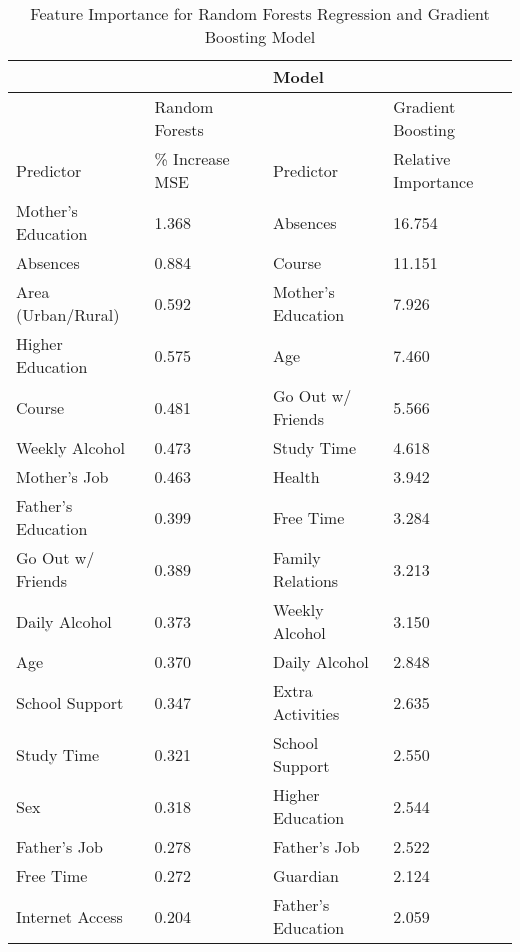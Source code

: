 \documentclass[sigconf]{acmart}
\begin{document}
\begin{table*}
  \caption{Feature Importance for Random Forests Regression and 
  Gradient Boosting Model}
  \label{tab:freq}
  \begin{tabular}{lllll}
    \toprule
                        &           &  & Model & \\ 
    \midrule  
                        & Random Forests & & &  Gradient Boosting \\    
    \midrule   
    Predictor           & \% Increase MSE & & Predictor &  Relative Importance \\    
    \midrule
    Mother's Education  &  1.368 &   &      Absences	        &  16.754	\\
    Absences            &  0.884 &   &      Course	            &  11.151   \\
    Area (Urban/Rural)  &  0.592 &   &      Mother's Education  &   7.926	\\
    Higher Education    &  0.575 &   &      Age	                &   7.460   \\   
    Course              &  0.481 &   &      Go Out w/ Friends	&   5.566   \\ 
    Weekly Alcohol      &  0.473 &   &      Study Time          &   4.618   \\
    Mother's Job        &  0.463 &   &      Health	            &   3.942   \\  
    Father's Education  &  0.399 &   &      Free Time	        &   3.284	\\      
    Go Out w/ Friends   &  0.389 &   &      Family Relations 	&   3.213	\\
    Daily Alcohol       &  0.373 &   &      Weekly Alcohol      &   3.150	\\
    Age                 &  0.370 &   &      Daily Alcohol       &   2.848   \\
    School Support      &  0.347 &   &      Extra Activities    &   2.635   \\  
    Study Time          &  0.321 &   &      School Support  	&   2.550   \\
    Sex                 &  0.318 &   &      Higher Education	&   2.544   \\
    Father's Job        &  0.278 &   &      Father's Job 	    &   2.522   \\     
    Free Time           &  0.272 &   &      Guardian            &   2.124	\\
    Internet Access     &  0.204 &   &      Father's Education  &   2.059   \\   

\end{tabular}
\end{table*}
\end{document}
